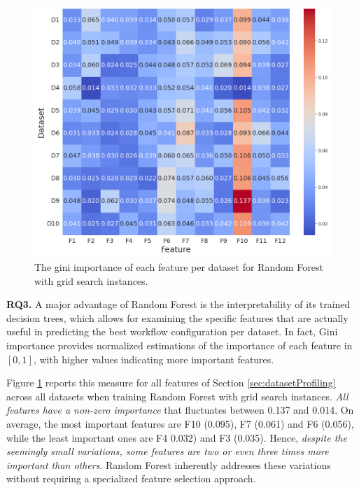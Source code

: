 \begin{figure}[t]
    \centering
    \includegraphics[width=0.85\linewidth]{Nikoletos-paper/figures/gini.png}
    \caption{The gini importance of each feature per dataset for Random Forest with grid search instances.}
    \label{fig:gini}
\end{figure}



\textbf{RQ3.} A major advantage of Random Forest is the interpretability of its trained decision trees, which allows for examining the specific features that are actually useful in predicting the best workflow configuration per dataset. In fact, Gini importance provides normalized estimations of the importance of each feature in $[0,1]$, with higher values indicating more important features. 

Figure \ref{fig:gini} reports this measure for all features of Section \ref{sec:datasetProfiling} across all datasets when training Random Forest with grid search instances. \textit{All features have a non-zero importance} that fluctuates between 0.137 and 0.014. On average, the most important features are F10 (0.095), F7 (0.061) and F6 (0.056), while the least important ones are F4 0.032) and F3 (0.035). Hence, \textit{despite the seemingly small variations, some features are two or even three times more important than others}. Random Forest inherently addresses these variations without requiring a specialized feature selection approach.




